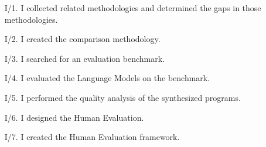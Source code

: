 \begin{enumerate}[wide = 0pt, widest = {I/4.}, leftmargin =*]
	
	\item[I/1.] I collected related methodologies and determined the gaps in those methodologies.
	
	\item[I/2.] I created the comparison methodology.
	
	\item[I/3.] I searched for an evaluation benchmark.
	
	\item[I/4.] I evaluated the Language Models on the benchmark.
	
	\item[I/5.] I performed the quality analysis of the synthesized programs.
	
	\item[I/6.] I designed the Human Evaluation.
	
	\item[I/7.] I created the Human Evaluation framework.
	
\end{enumerate}
